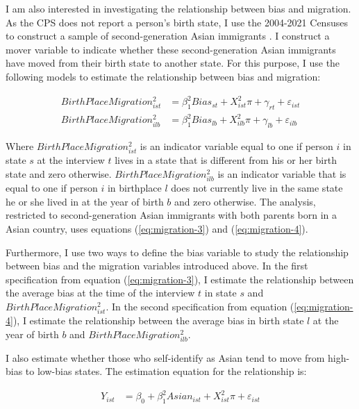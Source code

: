 I am also interested in investigating the relationship between bias and migration. As the CPS does not report a person's birth state, I use the 2004-2021 Censuses to construct a sample of second-generation Asian immigrants \autocite{floodsarahIntegratedPublicUse2021}. I construct a mover variable to indicate whether these second-generation Asian immigrants have moved from their birth state to another state. For this purpose, I use the following models to estimate the relationship between bias and migration:

\begin{align}
BirthPlaceMigration_{ist}^2 &= \beta_1^2 Bias_{st} 
                   + X_{ist}^2\pi + \gamma_{rt} 
                   + \varepsilon_{ist} \label{eq:migration-3} \\
BirthPlaceMigration_{ilb}^2 &= \beta_1^2 Bias_{lb} 
                   + X_{ilb}^2\pi + \gamma_{lb} 
                   + \varepsilon_{ilb} \label{eq:migration-4}
\end{align}

Where $BirthPlaceMigration_{ist}^2$ is an indicator variable equal to one if person $i$ in state $s$ at the interview $t$ lives in a state that is different from his or her birth state and zero otherwise. $BirthPlaceMigration_{ilb}^2$ is an indicator variable that is equal to one if person $i$ in birthplace $l$ does not currently live in the same state he or she lived in at the year of birth $b$ and zero otherwise. The analysis, restricted to second-generation Asian immigrants with both parents born in a Asian country, uses equations (\ref{eq:migration-3}) and (\ref{eq:migration-4}). 

Furthermore, I use two ways to define the bias variable to study the relationship between bias and the migration variables introduced above. In the first specification from equation (\ref{eq:migration-3}), I estimate the relationship between the average bias at the time of the interview $t$ in state $s$ and $BirthPlaceMigration_{ist}^2$. In the second specification from equation (\ref{eq:migration-4}), I estimate the relationship between the average bias in birth state $l$ at the year of birth $b$ and $BirthPlaceMigration_{ilb}^2$.

I also estimate whether those who self-identify as Asian tend to move from high-bias to low-bias states. The estimation equation for the relationship is: 

\begin{align}
Y_{ist} &= \beta_0 + \beta_1^2 Asian_{ist} +
                   X_{ist}^2\pi
                   + \varepsilon_{ist} \label{eq:migration-5}
\end{align}

